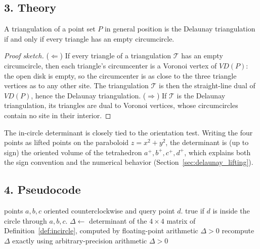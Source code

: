 \subsection{3. Theory}

\begin{theorem}\label{thm:empty_circle}
A triangulation of a point set $P$ in general position is the Delaunay
triangulation if and only if every triangle has an empty circumcircle.
\end{theorem}

\begin{proof}[Proof sketch]
($\Leftarrow$) If every triangle of a triangulation $\mathcal{T}$ has an empty
circumcircle, then each triangle's circumcenter is a Voronoi vertex of
$VD(P)$: the open disk is empty, so the circumcenter is as close to the three
triangle vertices as to any other site. The triangulation $\mathcal{T}$ is then
the straight-line dual of $VD(P)$, hence the Delaunay triangulation.
($\Rightarrow$) If $\mathcal{T}$ is the Delaunay triangulation, its triangles
are dual to Voronoi vertices, whose circumcircles contain no site in their
interior.
\end{proof}

The in-circle determinant is closely tied to the orientation test. Writing the
four points as lifted points on the paraboloid $z = x^2 + y^2$, the
determinant is (up to sign) the oriented volume of the tetrahedron
$a^+, b^+, c^+, d^+$, which explains both the sign convention and the numerical
behavior (Section~\ref{sec:delaunay_lifting}).

\subsection{4. Pseudocode}

\begin{algorithm}[htbp]
\caption{Adaptive In-Circle Predicate}
\label{alg:incircle}
\begin{algorithmic}[1]
\Require points $a,b,c$ oriented counterclockwise and query point $d$.
\Ensure true if $d$ is inside the circle through $a,b,c$.
  \State $\Delta \gets $ determinant of the $4 \times 4$ matrix of
         Definition~\ref{def:incircle}, computed by floating-point arithmetic
    \State \Return $\Delta > 0$
  \Else
    \State recompute $\Delta$ exactly using arbitrary-precision arithmetic
    \State \Return $\Delta > 0$
  \EndIf
\EndFunction
\end{algorithmic}
\end{algorithm}

